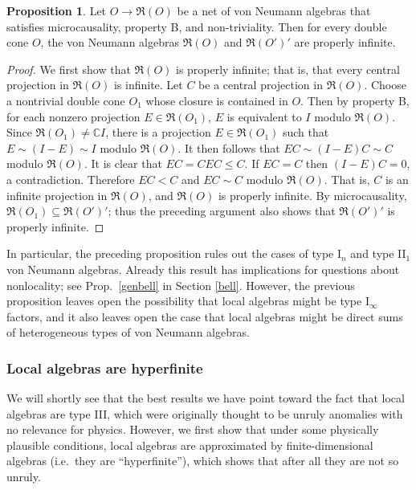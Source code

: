 \documentclass[11pt]{article}
\newcommand{\alg}[1]{\mathfrak{#1}}
\theoremstyle{definition}
\newtheorem{prop}[thm]{Proposition}
\theoremstyle{definition}
\theoremstyle{remark}
\def\7#1{{\mathbb #1}}
\begin{document}
\begin{prop} Let $O\to \alg{R}(O)$ be a net of von Neumann algebras that satisfies
  microcausality, property B, and non-triviality.  Then for every double cone $O$, the
  von Neumann algebras $\alg{R}(O)$ and $\alg{R}(O')'$ are properly infinite.
  \label{infinite}
\end{prop}

\begin{proof} We first show that $\alg{R}(O)$ is
  properly infinite; that is, that every central
  projection in $\alg{R}(O)$ is infinite.  Let $C$ be a
  central projection in $\alg{R}(O)$.  Choose a
  nontrivial double cone $O_1$ whose closure is
  contained in $O$.  Then by property B, for each
  nonzero projection $E\in \alg{R}(O_1)$, $E$ is
  equivalent to $I$ modulo $\alg{R}(O)$.  Since
  $\alg{R}(O_1)\neq \7C I$, there is a projection $E\in
  \alg{R}(O_1)$ such that $E\sim (I-E)\sim I$ modulo
  $\alg{R}(O)$.  It then follows that $EC\sim
  (I-E)C\sim C$ modulo $\alg{R}(O)$.  It is clear that
  $EC=CEC\leq C$.  If $EC=C$ then $(I-E)C=0$, a
  contradiction.  Therefore $EC<C$ and $EC\sim C$
  modulo $\alg{R}(O)$.  That is, $C$ is an infinite
  projection in $\alg{R}(O)$, and $\alg{R}(O)$ is
  properly infinite.  By microcausality,
  $\alg{R}(O_1)\subseteq \alg{R}(O')'$; thus the
  preceding argument also shows that $\alg{R}(O')'$ is
  properly infinite.
\end{proof}

In particular, the preceding proposition rules out the cases of type I$_n$ and type
II$_1$ von Neumann algebras.  Already this result has implications for questions
about nonlocality; see Prop.\ \ref{genbell} in Section \ref{bell}.  However, the
previous proposition leaves open the possibility that local algebras might be type
I$_\infty$ factors, and it also leaves open the case that local algebras might be
direct sums of heterogeneous types of von Neumann algebras.

\subsubsection{Local algebras are hyperfinite}

We will shortly see that the best results we have point toward the fact that local
algebras are type III, which were originally thought to be unruly anomalies with no
relevance for physics.  However, we first show that under some physically plausible
conditions, local algebras are approximated by finite-dimensional algebras (i.e.\
they are ``hyperfinite''), which shows that after all they are not so unruly.
\end{document}
